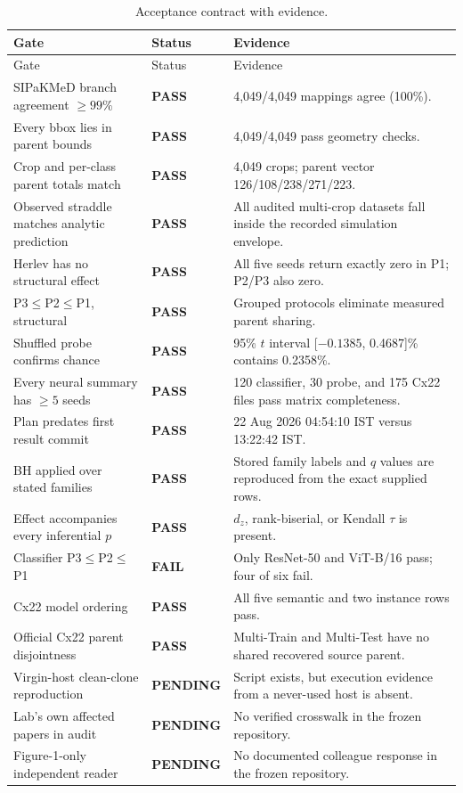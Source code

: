 \documentclass[11pt,oneside]{report}
\newcommand{\protocol}[1]{\textsf{#1}}
\newcommand{\pass}{\textcolor{CytoTeal}{\textbf{PASS}}}
\newcommand{\fail}{\textcolor{CytoRed}{\textbf{FAIL}}}
\newcommand{\pending}{\textcolor{CytoGold!80!black}{\textbf{PENDING}}}
\begin{document}
\begin{longtable}{p{}p{}p{}}
\caption{Acceptance contract with evidence.}
\label{tab:acceptance}\\
\toprule
Gate & Status & Evidence \\
\midrule
\endfirsthead
\toprule
Gate & Status & Evidence \\
\midrule
\endhead
\bottomrule
\endfoot
SIPaKMeD branch agreement $\geq99\%$ & \pass & 4,049/4,049 mappings agree (100\%). \\
Every bbox lies in parent bounds & \pass & 4,049/4,049 pass geometry checks. \\
Crop and per-class parent totals match & \pass & 4,049 crops; parent vector 126/108/238/271/223. \\
Observed straddle matches analytic prediction & \pass & All audited multi-crop datasets fall inside the recorded simulation envelope. \\
Herlev has no structural effect & \pass & All five seeds return exactly zero in \protocol{P1}; \protocol{P2}/\protocol{P3} also zero. \\
\protocol{P3}$\leq$\protocol{P2}$\leq$\protocol{P1}, structural & \pass & Grouped protocols eliminate measured parent sharing. \\
Shuffled probe confirms chance & \pass & 95\% $t$ interval [$-0.1385$, 0.4687]\% contains 0.2358\%. \\
Every neural summary has $\geq5$ seeds & \pass & 120 classifier, 30 probe, and 175 Cx22 files pass matrix completeness. \\
Plan predates first result commit & \pass & 22 Aug 2026 04:54:10 IST versus 13:22:42 IST. \\
BH applied over stated families & \pass & Stored family labels and $q$ values are reproduced from the exact supplied rows. \\
Effect accompanies every inferential $p$ & \pass & $d_z$, rank-biserial, or Kendall $\tau$ is present. \\
Classifier \protocol{P3}$\leq$\protocol{P2}$\leq$\protocol{P1} & \fail & Only ResNet-50 and ViT-B/16 pass; four of six fail. \\
Cx22 model ordering & \pass & All five semantic and two instance rows pass. \\
Official Cx22 parent disjointness & \pass & Multi-Train and Multi-Test have no shared recovered source parent. \\
Virgin-host clean-clone reproduction & \pending & Script exists, but execution evidence from a never-used host is absent. \\
Lab's own affected papers in audit & \pending & No verified crosswalk in the frozen repository. \\
Figure-1-only independent reader & \pending & No documented colleague response in the frozen repository. \\
\end{longtable}
\end{document}
